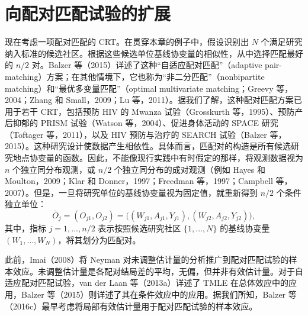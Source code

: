 \section{向配对匹配试验的扩展}

现在考虑一项配对匹配的 CRT。在贯穿本章的例子中，假设识别出 $N$ 个满足研究纳入标准的候选社区。根据这些候选单位基线协变量的相似性，从中选择匹配最好的 $n/2$ 对。Balzer 等（2015）详述了这种“自适应配对匹配”（adaptive pair-matching）方案；在其他情境下，它也称为“非二分匹配”（nonbipartite matching）和“最优多变量匹配”（optimal multivariate matching；Greevy 等，2004；Zhang 和 Small，2009；Lu 等，2011）。据我们了解，这种配对匹配方案已用于若干 CRT，包括预防 HIV 的 Mwanza 试验（Grosskurth 等，1995）、预防产后抑郁的 PRISM 试验（Watson 等，2004）、促进身体活动的 SPACE 研究（Toftager 等，2011），以及 HIV 预防与治疗的 SEARCH 试验（Balzer 等，2015）。这种研究设计使数据产生相依性。具体而言，匹配对的构造是所有候选研究地点协变量的函数。因此，不能像现行实践中有时假定的那样，将观测数据视为 $n$ 个独立同分布观测，或 $n/2$ 个独立同分布的成对观测（例如 Hayes 和 Moulton，2009；Klar 和 Donner，1997；Freedman 等，1997；Campbell 等，2007）。但是，一旦将研究单位的基线协变量视为固定值，就重新得到 $n/2$ 个条件独立单位：
\[
\bar O_j=(O_{j1},O_{j2})
=\bigl((W_{j1},A_{j1},Y_{j1}),(W_{j2},A_{j2},Y_{j2})\bigr),
\]
其中，指标 $j=1,\ldots,n/2$ 表示按照候选研究社区 $\{1,\ldots,N\}$ 的基线协变量 $(W_1,\ldots,W_N)$，将其划分为匹配对。

此前，Imai（2008）将 Neyman 对未调整估计量的分析推广到配对匹配试验的样本效应。未调整估计量是各配对结局差的平均，无偏，但并非有效估计量。对于自适应配对匹配试验，van der Laan 等（2013a）详述了 TMLE 在总体效应中的应用，Balzer 等（2015）则详述了其在条件效应中的应用。据我们所知，Balzer 等（2016c）最早考虑将局部有效估计量用于配对匹配试验的样本效应。

